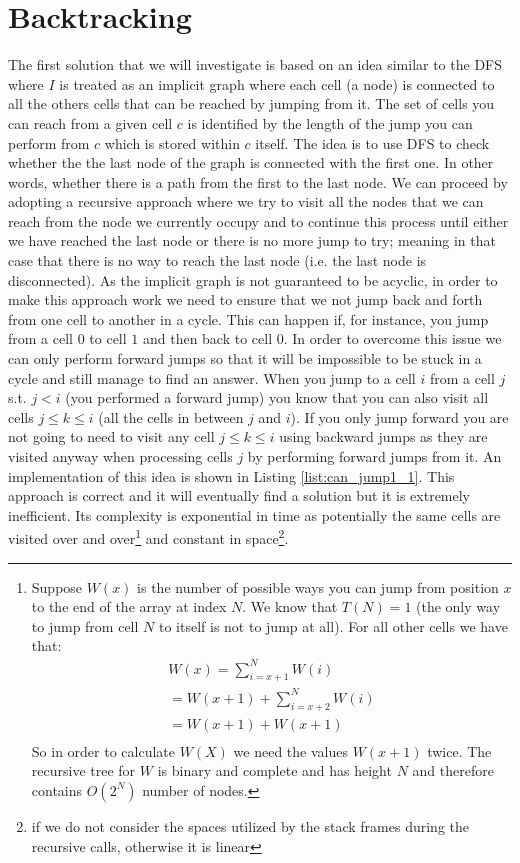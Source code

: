 \section{Backtracking}
\label{can_jump:sec:backtracking}
The first solution that we will investigate is based on an idea similar to the DFS where $I$
is treated as an implicit graph where each cell (a node) is connected to all the others cells that can be
reached by jumping from it. The set of cells you can reach from a given cell $c$ is identified by
the length of the jump you can perform from $c$ which is stored within $c$ itself. The idea is to
use DFS to check whether the the last node of the graph is connected with the first one. In other
words, whether there is a path from the first to the last node. We can proceed by adopting a
recursive approach where we try to visit all the nodes that we can reach from the node we currently
occupy and to continue this process until either we have reached the last node or there is no more
jump to try; meaning in that case that there is no way to reach the last node (i.e. the last node is
disconnected). As the implicit graph is not guaranteed to be acyclic, in order to make this
approach work we need to ensure that we not jump back and forth from one cell to another in a
cycle. This can happen if, for instance,  you jump from a cell $0$ to cell $1$ and then back to cell
$0$. In order to overcome this issue we can only perform forward jumps so that it will be impossible
to be stuck in a cycle and still manage to find an answer. When you jump to a cell $i$ from a cell
$j$ s.t. $j < i$ (you performed a forward jump) you know that you can also visit all cells $ j \leq
k \leq i$ (all the cells in between $j$ and $i$). If you only jump forward you are not going to need
to visit any cell $ j \leq k \leq i$ using backward jumps as they are visited anyway when processing
cells $j$ by performing forward jumps from it. An implementation of this idea is shown in Listing
\ref{list:can_jump1_1}. This approach is correct and it will eventually find a solution but it is
extremely inefficient. Its complexity is exponential in time as potentially the same cells are
visited over and over\footnote{Suppose $W(x)$ is the number of possible ways you can jump from
position $x$ to the end of the array at index $N$. We know that $T(N) = 1$ (the only way to jump
from cell $N$ to itself is not to jump at all). For all other cells we have that:
	\begin{align*}
		W(x) = \sum_{i=x+1}^N W(i) \\
		 = W(x+1) + \sum_{i=x+2}^N W(i) \\
		 = W(x+1) + W(x+1) \\
	  \end{align*}
	So in order to calculate $W(X)$ we need the values  $W(x+1)$ twice. The recursive tree for
	$W$ is binary and complete and has height $N$ and therefore contains $O(2^N)$ number of nodes.}
	and constant in space\footnote{if we do not consider the spaces utilized by the stack frames
	during the recursive calls, otherwise it is linear}.

